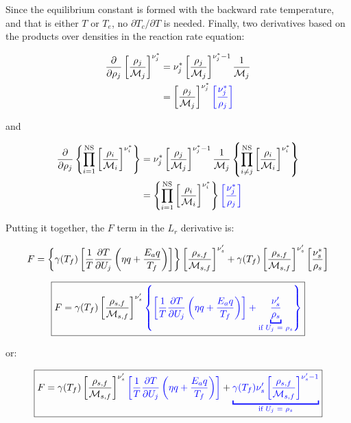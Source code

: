 \documentclass[10pt]{article}
\begin{document}
\begin{flushleft}
Since the equilibrium constant is formed with the backward rate temperature, and that is either $T$ or $T_e$, no $\partial T_c / \partial T$ is needed. Finally, two derivatives based on the products over densities in the reaction rate equation:

\begin{align}
    \frac{\partial }{\partial \rho_j} \left[ \frac{\rho_{j}}{\mathcal{M}_j} \right]^{\nu_j^*} &= \nu_j^* \left[ \frac{\rho_{j}}{\mathcal{M}_j} \right]^{\nu_j^* - 1} \frac{1}{\mathcal{M}_j}
    \\ &= \left[ \frac{\rho_j}{\mathcal{M}_j} \right]^{\nu_j^*} \textcolor{blue}{\left[ \frac{\nu_j^*}{\rho_j} \right]}
\end{align}

and

\begin{align}
    \frac{\partial }{\partial \rho_j} \left\{ \prod_{i=1}^\text{NS} \left[ \frac{\rho_i}{\mathcal{M}_i} \right]^{\nu_i^*} \right\} &= \nu_j^* \left[ \frac{\rho_j}{\mathcal{M}_j} \right]^{\nu_j^* - 1} \frac{1}{\mathcal{M}_j} \left\{ \prod_{i \neq j}^\text{NS} \left[ \frac{\rho_i}{\mathcal{M}_i} \right]^{\nu_i^*}  \right\}
    \\ &= \left\{ \prod_{i=1}^\text{NS} \left[ \frac{\rho_i}{\mathcal{M}_i} \right]^{\nu_i^*}  \right\}  \textcolor{blue}{\left[ \frac{\nu_j^*}{\rho_j} \right]}
\end{align}

Putting it together, the $F$ term in the $L_r$ derivative is:

\begin{equation}
     F = \left\{  \gamma(T_f) \left[  \frac{1}{T} \frac{\partial T}{\partial U_j} \left(  \eta q + \frac{E_a q}{T_f} \right) \right]  \right\} \left[ \frac{\rho_{s,f}}{\mathcal{M}_{s,f}} \right]^{\nu_s'}  + \gamma(T_f)  \left[ \frac{\rho_{s,f}}{\mathcal{M}_{s,f}} \right]^{\nu_s'} \left[ \frac{\nu_s^*}{\rho_s} \right]
\end{equation}

\begin{equation}
    \boxed{F = \gamma(T_f) \bb{\frac{\rho_{s,f}}{\mathcal{M}_{s,f}}}^{\nu_s'} \textcolor{blue}{\bcb{ \bb{ \frac{1}{T} \pd{T}{U_j} \bp{ \eta q + \frac{E_a q}{T_f}}} + \underbracket{\frac{\nu_s'}{\rho_s}}_{\text{if $U_j$ = $\rho_s$}} }}}
\end{equation}

or:

\begin{equation}
    \boxed{F = \gamma(T_f) \bb{\frac{\rho_{s,f}}{\mathcal{M}_{s,f}}}^{\nu_s'} \textcolor{blue}{ \bb{ \frac{1}{T} \pd{T}{U_j} \bp{ \eta q + \frac{E_a q}{T_f}}}} + \textcolor{blue}{\underbracket{\gamma(T_f) \nu_s' \bb{\frac{\rho_{s,f}}{\mathcal{M}_{s,f}}}^{\nu_s' - 1}}_{\text{if $U_j$ = $\rho_s$}}}}
\end{equation}


\end{flushleft}
\end{document}
